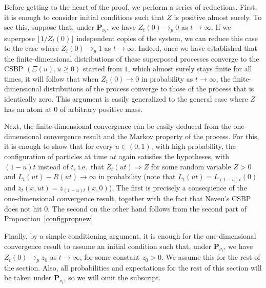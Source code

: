 \documentclass[10pt]{amsart}
\theoremstyle{definition}\newtheorem{defi}[theo]{Definition}\newtheorem{rema}[theo]{Remark}\newtheorem{exam}[theo]{Example}\newtheorem{exem}[theo]{Example}\newtheorem{nota}[theo]{Notation}
\renewcommand*\P{\mathbf{P}}
\newcommand{\1} {\mathds{1}}
\renewcommand*\to{\rightarrow}
\begin{document}
Before getting to the heart of the proof, we perform a series of reductions. First, it is enough to consider initial conditions such that $Z$ is positive almost surely. To see this, suppose that, under $\P_{\nu_t}$, we have $Z_t(0)\to_p 0$ as $t\to\infty$. If we superpose $\lfloor 1/Z_t(0)\rfloor$ independent copies of the system, we can reduce this case to the case where $Z_t(0)\to_p 1$ as $t\to\infty$. Indeed, once we have established that the finite-dimensional distributions of these superposed processes converge to the CSBP $(\Xi(u), u \geq 0)$ started from $1$, which almost surely stays finite for all times, it will follow that when $Z_t(0)\to0$ in probability as $t\to\infty$, the finite-dimensional distributions of the process converge to those of the process that is identically zero. This argument is easily generalized to the general case where $Z$ has an atom at $0$ of arbitrary positive mass.

Next, the finite-dimensional convergence can be easily deduced from the one-dimensional convergence result and the Markov property of the process. For this, it is enough to show that for every $u\in (0,1)$, with high probability, the configuration of particles at time $ut$ again satisfies the hypotheses, with $(1-u)t$ instead of $t$, i.e.~that $Z_t(ut) \Rightarrow Z$ for some random variable $Z>0$ and $L_t(ut) - R(ut) \to \infty$ in probability (note that $L_t(ut) = L_{(1-u)t}(0)$ and $z_t(x,ut) = z_{(1-u)t}(x,0)$). The first is precisely a consequence of the one-dimensional convergence result, together with the fact that Neveu's CSBP does not hit 0. The second on the other hand follows from the second part of Proposition~\ref{configpropnew}.

Finally, by a simple conditioning argument, it is enough for the one-dimensional convergence result to assume an initial condition such that, under $\P_{\nu_t}$, we have $Z_t(0) \to_p z_0$ as $t\to\infty$, for some constant $z_0>0$. We assume this for the rest of the section. Also, all probabilities and expectations for the rest of this section will be taken under $\P_{\nu_t}$, so we will omit the subscript.
\end{document}
